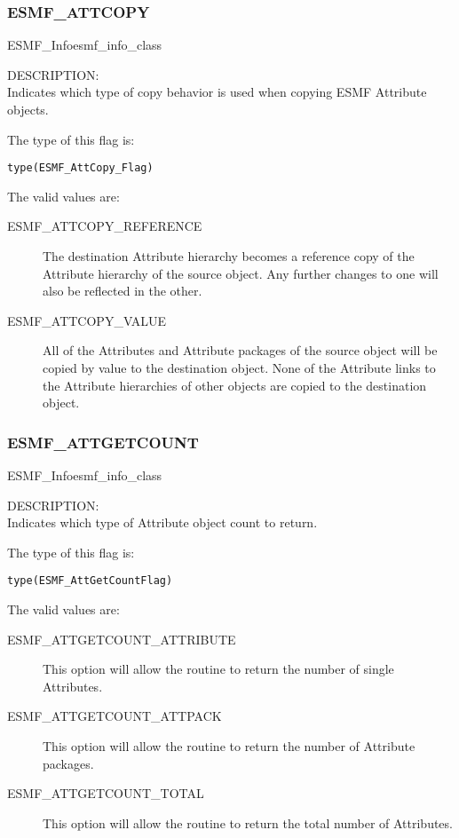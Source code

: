 
\subsubsection{ESMF\_ATTCOPY}
\label{const:attcopy}
{ESMF\_Info}{esmf_info_class}

{\sf DESCRIPTION:\\}
Indicates which type of copy behavior is used when copying ESMF Attribute objects.

The type of this flag is:

{\tt type(ESMF\_AttCopy\_Flag)}

The valid values are:
\begin{description}
  \item[ESMF\_ATTCOPY\_REFERENCE]
    The destination Attribute hierarchy becomes a reference copy of
    the Attribute hierarchy of the source object. Any further changes to one
    will also be reflected in the other.
  \item[ESMF\_ATTCOPY\_VALUE]
    All of the Attributes and Attribute packages of the source object will be
    copied by value to the destination object. None of the Attribute links to
    the Attribute hierarchies of other objects are copied to the
    destination object.
\end{description}

\subsubsection{ESMF\_ATTGETCOUNT}
\label{const:attgetcount}
{ESMF\_Info}{esmf_info_class}

{\sf DESCRIPTION:\\}
Indicates which type of Attribute object count to return.

The type of this flag is:

{\tt type(ESMF\_AttGetCountFlag)}

The valid values are:
\begin{description}
	\item[ESMF\_ATTGETCOUNT\_ATTRIBUTE]
	This option will allow the routine to return the number of single Attributes.
	\item[ESMF\_ATTGETCOUNT\_ATTPACK]
	This option will allow the routine to return the number of Attribute packages.
	\item[ESMF\_ATTGETCOUNT\_TOTAL]
	This option will allow the routine to return the total number of Attributes.
\end{description}

